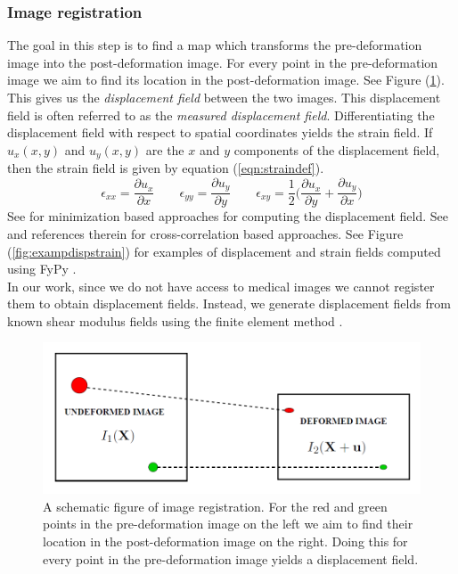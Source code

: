 \documentclass[12pt]{article}
\newcommand{\beq}{\begin{equation}}
\newcommand{\eeq}{\end{equation}}
\newcommand{\pdd}[2]{\frac{\partial{{#1}}}{\partial{#2}}}
\begin{document}
\subsubsection{Image registration} The goal in this step is to find a map which transforms the pre-deformation image into the post-deformation image. For every point in the pre-deformation image we aim to find its location in the post-deformation image. See Figure (\ref{fig:registschematic}). This gives us the \textit{displacement field} between the two images. This displacement field is often referred to as the \textit{measured displacement field}. Differentiating the displacement field with respect to spatial coordinates yields the strain field. If $u_x(x,y)$ and $u_{y}(x,y)$ are the $x$ and $y$ components of the displacement field, then the strain field is given by equation (\ref{eqn:straindef}).
\beq
\label{eqn:straindef}
\epsilon_{xx} = \pdd{u_{x}}{x} \qquad \epsilon_{yy} = \pdd{u_{y}}{y} \qquad \epsilon_{xy} = \frac{1}{2}\Big(\pdd{u_{x}}{y} + \pdd{u_{y}}{x}\Big)
\eeq
See \cite{paper:richards2009,paper:gokhale2004,paper:pellot-barakat2004} for minimization based approaches for computing the displacement field. See \cite{paper:ophir1991,paper:ophir1996,paper:alam1998} and references therein for cross-correlation based approaches. See Figure (\ref{fig:exampdispstrain}) for examples of displacement and strain fields computed using FyPy \cite{misc:fypy}.\\In our work, since we do not have access to medical images we cannot register them to obtain displacement fields. Instead, we generate displacement fields from known shear modulus fields using the finite element method \cite{book:hugheslinear,book:fishbelytschko}.
%
\begin{figure}[h]
  \centering
  \includegraphics[totalheight=4cm]{Figures/regist.png}
  \caption{\label{fig:registschematic} A schematic figure of image registration. For the red and green points in the pre-deformation image on the left we aim to find their location in the post-deformation image on the right. Doing this for every point in the pre-deformation image yields a displacement field.}
\end{figure}
\end{document}
